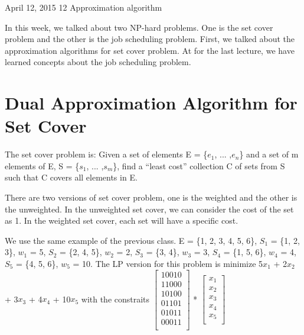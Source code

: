 \documentclass[usletter]{article}
\begin{document}
           {April 12, 2015}                          %
           {12}                                       %
           {Approximation algorithm}  %

\noindent
In this week, we talked about two NP-hard problems. One is the set cover problem and the other is the job scheduling problem. First, we talked about the approximation algorithms for set cover problem. At for the last lecture, we have learned concepts about the job scheduling problem.

\section{Dual Approximation Algorithm for Set Cover}
The set cover problem is: Given a set of elements E = \{$e_{1}$, ... ,$e_{n}$\} and a set of m elements of E, S = \{$s_{1}$, ... ,$s_{m}$\}, find a “least cost” collection C of sets from S such that C covers all elements in E.

There are two versions of set cover problem, one is the weighted and the other is the unweighted. In the unweighted set cover, we can consider the cost of the set as 1. In the weighted set cover, each set will have a specific cost.

We use the same example of the previous class.
E = \{1, 2, 3, 4, 5, 6\}, $S_{1}$ = \{1, 2, 3\}, $w_{1}$ = 5, $S_{2}$ = \{2, 4, 5\}, $w_{2}$ = 2,  $S_{3}$ = \{3, 4\}, $w_{3}$ = 3, $S_{4}$ = \{1, 5, 6\}, $w_{4}$ = 4,  $S_{5}$ = \{4, 5, 6\}, $w_{5}$ = 10. The LP version for this problem is minimize 5$x_{1}$ + 2$x_{2}$ + 3$x_{3}$ + 4$x_{4}$ + 10$x_{5}$ with the constraits $\left[
\begin{array}{c}
1 0 0 1 0 \\
1 1 0 0 0 \\
1 0 1 0 0 \\
0 1 1 0 1 \\
0 1 0 1 1 \\
0 0 0 1 1 \\
\end{array}
\right]$ * $\left[
\begin{array}{c}
x_{1} \\
x_{2} \\
x_{3} \\
x_{4} \\
x_{5} \\
\end{array}
\right]$
\end{document}
